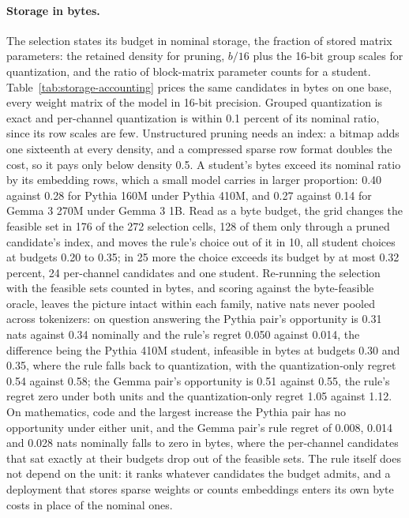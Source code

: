 \paragraph{Storage in bytes.} The selection states its budget in nominal storage, the fraction of
stored matrix parameters: the retained density for pruning, $b/16$ plus the 16-bit group scales for
quantization, and the ratio of block-matrix parameter counts for a student.
Table~\ref{tab:storage-accounting} prices the same candidates in bytes on one base, every weight
matrix of the model in 16-bit precision. Grouped quantization is exact and per-channel quantization
is within 0.1 percent of its nominal ratio, since its row scales are few. Unstructured pruning needs
an index: a bitmap adds one sixteenth at every density, and a compressed sparse row format doubles
the cost, so it pays only below density 0.5. A student's bytes exceed its nominal ratio by its
embedding rows, which a small model carries in larger proportion: 0.40 against 0.28 for Pythia 160M
under Pythia 410M, and 0.27 against 0.14 for Gemma 3 270M under Gemma 3 1B. Read as a byte budget, the grid changes the feasible set in 176 of the 272 selection cells, 128 of
them only through a pruned candidate's index, and moves the rule's choice out of it in 10, all
student choices at budgets 0.20 to 0.35; in 25 more the choice exceeds its budget by at most 0.32
percent, 24 per-channel candidates and one student. Re-running the selection with the feasible sets counted
in bytes, and scoring against the byte-feasible oracle, leaves the picture intact within each family,
native nats never pooled across tokenizers: on question answering the Pythia pair's opportunity is
0.31 nats against 0.34 nominally and the rule's regret 0.050 against 0.014, the difference being the
Pythia 410M student, infeasible in bytes at budgets 0.30 and 0.35, where the rule falls back to
quantization, with the quantization-only regret 0.54 against 0.58; the Gemma pair's opportunity is
0.51 against 0.55, the rule's regret zero under both units and the quantization-only regret 1.05
against 1.12. On mathematics, code and the largest increase the Pythia pair has no opportunity under
either unit, and the Gemma pair's rule regret of 0.008, 0.014 and 0.028 nats nominally falls to zero
in bytes, where the per-channel candidates that sat exactly at their budgets drop out of the
feasible sets. The rule
itself does not depend on the unit: it ranks whatever candidates the budget admits, and a deployment
that stores sparse weights or counts embeddings enters its own byte costs in place of the nominal ones.


